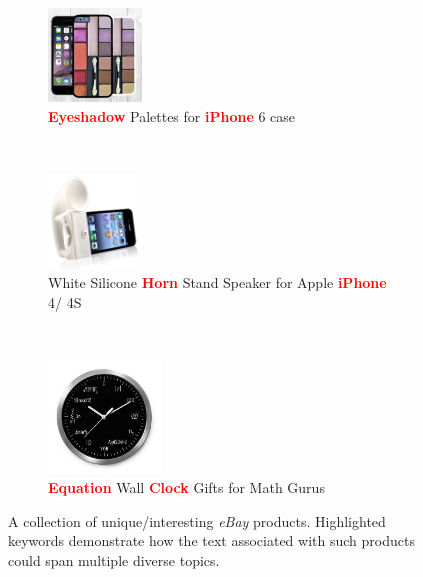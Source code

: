 \documentclass{article} %
\begin{document}
\begin{figure}
\label{fig:ebay-products}
        \centering
         \begin{subfigure}[b]{0.3\textwidth}
        	        \centering
                \includegraphics[width=25mm]{figures/eyeshadow-iphone-case.jpg}
                \caption{\textcolor{red}{{\bf Eyeshadow}} Palettes for \textcolor{red}{{\bf iPhone}} 6 case}
                \label{fig:eyeshadow-iphone-case}
        \end{subfigure}
              ~ %
        \begin{subfigure}[b]{0.3\textwidth}
		 \centering
                \includegraphics[width=25mm]{figures/horn-iphone-speaker.jpg}
\caption{White Silicone \textcolor{red}{{\bf Horn}} Stand Speaker for Apple \textcolor{red}{{\bf iPhone}} 4/ 4S}                \label{fig:zeppelin-speaker}
        \end{subfigure}
       ~ %
        \begin{subfigure}[b]{0.3\textwidth}
		 \centering
                \includegraphics[width=30mm]{figures/geeky-clock.jpg}
\caption{\textcolor{red}{{\bf Equation}} Wall \textcolor{red}{{\bf Clock}} Gifts for Math Gurus}                \label{fig:geeky-clock}
        \end{subfigure}
       \caption{A collection of unique/interesting {\em eBay} products. Highlighted keywords demonstrate how the text associated with such products could span multiple diverse topics.}
       \label{fig:ebay-products}
\end{figure}
\end{document}
